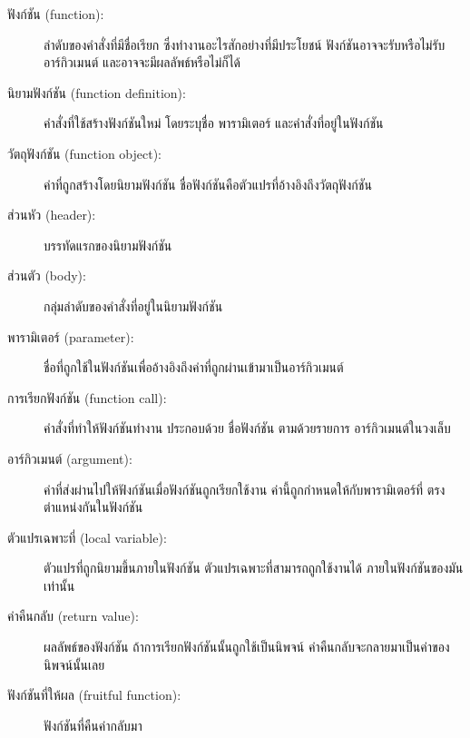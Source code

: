 \begin{description}

\item[ฟังก์ชัน (function):] ลำดับของคำสั่งที่มีชื่อเรียก ซึ่งทำงานอะไรสักอย่างที่มีประโยชน์ 
ฟังก์ชันอาจจะรับหรือไม่รับอาร์กิวเมนต์ และอาจจะมีผลลัพธ์หรือไม่ก็ได้

\item[นิยามฟังก์ชัน (function definition):] คำสั่งที่ใช้สร้างฟังก์ชันใหม่ โดยระบุชื่อ พารามิเตอร์
และคำสั่งที่อยู่ในฟังก์ชัน  

\item[วัตถุฟังก์ชัน (function object):] ค่าที่ถูกสร้างโดยนิยามฟังก์ชัน ชื่อฟังก์ชันคือตัวแปรที่อ้างอิงถึงวัตถุฟังก์ชัน 

\item[ส่วนหัว (header):] บรรทัดแรกของนิยามฟังก์ชัน

\item[ส่วนตัว (body):] กลุ่มลำดับของคำสั่งที่อยู่ในนิยามฟังก์ชัน

\item[พารามิเตอร์ (parameter):] ชื่อที่ถูกใช้ในฟังก์ชันเพื่ออ้างอิงถึงค่าที่ถูกผ่านเข้ามาเป็นอาร์กิวเมนต์

\item[การเรียกฟังก์ชัน (function call):] คำสั่งที่ทำให้ฟังก์ชันทำงาน ประกอบด้วย ชื่อฟังก์ชัน ตามด้วยรายการ
อาร์กิวเมนต์ในวงเล็บ

\item[อาร์กิวเมนต์ (argument):] ค่าที่ส่งผ่านไปให้ฟังก์ชันเมื่อฟังก์ชันถูกเรียกใช้งาน ค่านี้ถูกกำหนดให้กับพารามิเตอร์ที่
ตรงตำแหน่งกันในฟังก์ชัน 

\item[ตัวแปรเฉพาะที่ (local variable):] ตัวแปรที่ถูกนิยามขึ้นภายในฟังก์ชัน ตัวแปรเฉพาะที่สามารถถูกใช้งานได้
ภายในฟังก์ชันของมันเท่านั้น 

\item[ค่าคืนกลับ (return value):] ผลลัพธ์ของฟังก์ชัน ถ้าการเรียกฟังก์ชันนั้นถูกใช้เป็นนิพจน์
ค่าคืนกลับจะกลายมาเป็นค่าของนิพจน์นั้นเลย

\item[ฟังก์ชันที่ให้ผล (fruitful function):] ฟังก์ชันที่คืนค่ากลับมา


\end{description}
